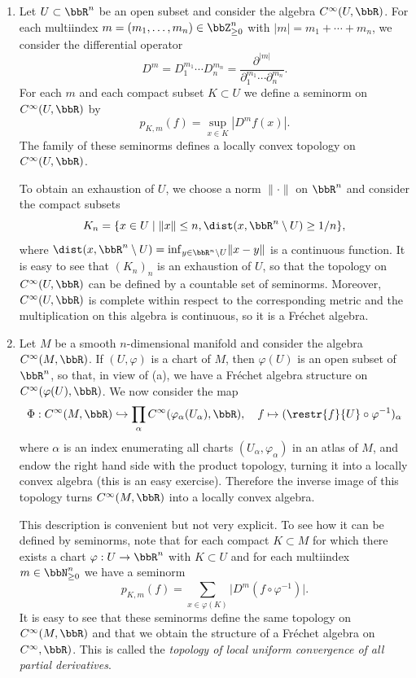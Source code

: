 \begin{example}
    \begin{enumerate}[label=(\alph*)]
        \item Let $U\subset \bbR^n$ be an open subset and consider the algebra $C^\infty(U,\bbR)$. For each multiindex $m=(m_1,\ldots,m_n)\in\bbZ_{\geq 0}^n$ with $|m|=m_1+\cdots+m_n$, we consider the differential operator
        \[D^m=D_1^{m_1}\cdots D_n^{m_n}=\frac{\partial^{|m|}}{{\partial_1^{m_1}\cdots \partial_n^{m_n}}}.\]
        For each $m$ and each compact subset $K\subset U$ we define a seminorm on $C^\infty(U,\bbR)$ by 
        \[p_{K,m}(f)=\sup_{x\in K}|D^mf(x)|.\]
        The family of these seminorms defines a locally convex topology on $C^\infty(U,\bbR)$.

        To obtain an exhaustion of $U$, we choose a norm $\lVert\cdot\rVert$ on $\bbR^n$ and consider the compact subsets
        \[K_n=\{x\in U\mid \lVert x\rVert\leq n, \dist(x,\bbR^n\setminus U)\geq 1/n\},\]
        where $\dist(x,\bbR^n\setminus U)=\inf_{y\in \bbR^n\setminus U} \lVert x-y\rVert$ is a continuous function. It is easy to see that $(K_n)_n$ is an exhaustion of $U$, so that the topology on $C^\infty(U,\bbR)$ can be defined by a countable set of seminorms. Moreover, $C^\infty(U,\bbR)$ is complete within respect to the corresponding metric and the multiplication on this algebra is continuous, so it is a Fr\'echet algebra.
        
        \item Let $M$ be a smooth $n$-dimensional manifold and consider the algebra $C^\infty(M,\bbR)$. If $(U,\varphi)$ is a chart of $M$, then $\varphi(U)$ is an open subset of $\bbR^n$, so that, in view of (a), we have a Fr\'echet algebra structure on $C^\infty(\varphi(U),\bbR)$. We now consider the map
        \[\Phi:C^\infty(M,\bbR)\hookrightarrow \prod_{\alpha}C^\infty(\varphi_\alpha(U_\alpha),\bbR),\quad f\mapsto (\restr{f}{U}\circ \varphi^{-1})_\alpha\]
        where $\alpha$ is an index enumerating all charts $(U_\alpha,\varphi_\alpha)$ in an atlas of $M$, and endow the right hand side with the product topology, turning it into a locally convex algebra (this is an easy exercise). Therefore the inverse image of this topology turns $C^\infty(M,\bbR)$ into a locally convex algebra.

        This description is convenient but not very explicit. To see how it can be defined by seminorms, note that for each compact $K\subset M$ for which there exists a chart $\varphi:U\to \bbR^n$ with $K\subset U$ and for each multiindex $m\in \bbN_{\geq 0}^n$ we have a seminorm
        \[p_{K,m}(f)=\sum_{x\in \varphi(K)}\lvert D^m(f\circ \varphi^{-1})\rvert.\]
        It is easy to see that these seminorms define the same topology on $C^\infty(M,\bbR)$ and that we obtain the structure of a Fr\'echet algebra on $C^\infty,\bbR)$. This is called the \emph{topology of local uniform convergence of all partial derivatives}.


\end{enumerate}
\end{example}
